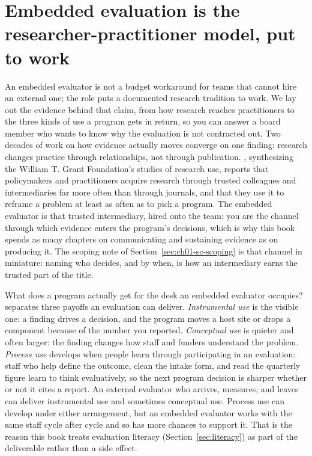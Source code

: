 \section{Embedded evaluation is the researcher-practitioner model, put to work}\label{sec:ch01-rpp}
An embedded evaluator is not a budget workaround for teams that cannot hire an external one; the role puts a documented research tradition to work. We lay out the evidence behind that claim, from how research reaches practitioners to the three kinds of use a program gets in return, so you can answer a board member who wants to know why the evaluation is not contracted out. Two decades of work on how evidence actually moves converge on one finding: research changes practice through relationships, not through publication. \textcite{tseng2012uses}, synthesizing the William T. Grant Foundation's studies of research use, reports that policymakers and practitioners acquire research through trusted colleagues and intermediaries far more often than through journals, and that they use it to reframe a problem at least as often as to pick a program. The embedded evaluator is that trusted intermediary, hired onto the team: you are the channel through which evidence enters the program's decisions, which is why this book spends as many chapters on communicating and sustaining evidence as on producing it. The scoping note of Section~\ref{sec:ch01-sc-scoping} is that channel in miniature: naming who decides, and by when, is how an intermediary earns the trusted part of the title.

What does a program actually get for the desk an embedded evaluator occupies? \textcite{patton2008utilization} separates three payoffs an evaluation can deliver. \emph{Instrumental use} is the visible one: a finding drives a decision, and the program moves a host site or drops a component because of the number you reported. \emph{Conceptual use} is quieter and often larger: the finding changes how staff and funders understand the problem. \emph{Process use} develops when people learn through participating in an evaluation: staff who help define the outcome, clean the intake form, and read the quarterly figure learn to think evaluatively, so the next program decision is sharper whether or not it cites a report. An external evaluator who arrives, measures, and leaves can deliver instrumental use and sometimes conceptual use. Process use can develop under either arrangement, but an embedded evaluator works with the same staff cycle after cycle and so has more chances to support it. That is the reason this book treats evaluation literacy (Section~\ref{sec:literacy}) as part of the deliverable rather than a side effect.

